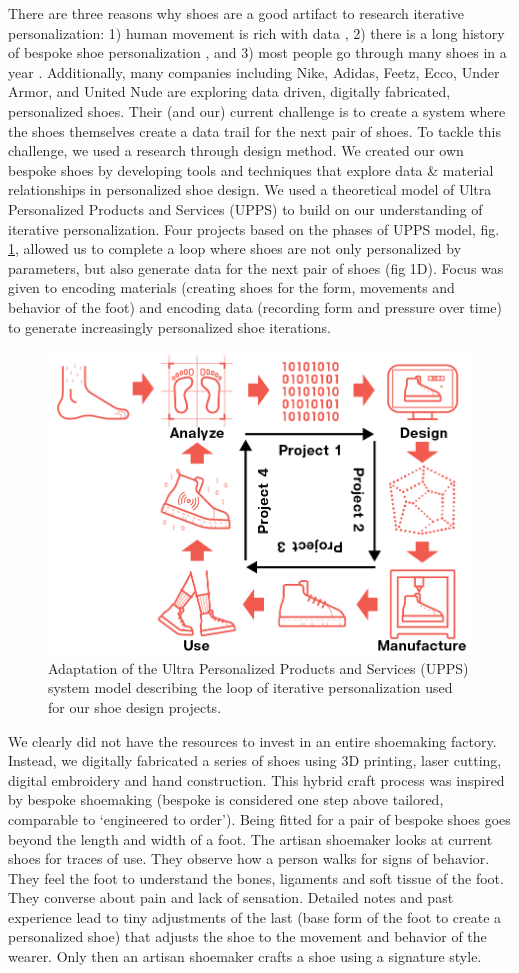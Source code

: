 There are three reasons why shoes are a good artifact to research iterative personalization: 1) human movement is rich with data \cite{Shanthikumar2010}, 2) there is a long history of bespoke shoe personalization \cite{Ball1935,Greene2018}, and 3) most people go through many shoes in a year \cite{Vertommen2011}. Additionally, many companies including Nike, Adidas, Feetz, Ecco, Under Armor, and United Nude are exploring data driven, digitally fabricated, personalized shoes. Their (and our) current challenge is to create a system where the shoes themselves create a data trail for the next pair of shoes. To tackle this challenge, we used a research through design method. We created our own bespoke shoes by developing tools and techniques that explore data \& material relationships in personalized shoe design. We used a theoretical model of Ultra Personalized Products and Services (UPPS) \cite{stolwijk2018going} to build on our understanding of iterative personalization. Four projects based on the phases of UPPS model, fig. \ref{fig:UPPSmodel}, allowed us to complete a loop where shoes are not only personalized by parameters, but also generate data for the next pair of shoes (fig 1D). Focus was given to encoding materials (creating shoes for the form, movements and behavior of the foot) and encoding data (recording form and pressure over time) to generate increasingly personalized shoe iterations. 

\begin{figure}
\includegraphics[width=.5\textwidth]{UPPSmodel}
\caption{Adaptation of the Ultra Personalized Products and Services (UPPS) system model describing the loop of iterative personalization used for our shoe design projects.}
\label{fig:UPPSmodel}
\end{figure}

We clearly did not have the resources to invest in an entire shoemaking factory. Instead, we digitally fabricated a series of shoes using 3D printing, laser cutting, digital embroidery and hand construction. This hybrid craft \cite{Devendorf2015} process was inspired by bespoke shoemaking (bespoke is considered one step above tailored, comparable to `engineered to order'). Being fitted for a pair of bespoke shoes goes beyond the length and width of a foot. The artisan shoemaker looks at current shoes for traces of use. They observe how a person walks for signs of behavior. They feel the foot to understand the bones, ligaments and soft tissue of the foot. They converse about pain and lack of sensation. Detailed notes and past experience lead to tiny adjustments of the last (base form of the foot to create a personalized shoe) that adjusts the shoe to the movement and behavior of the wearer. Only then an artisan shoemaker crafts a shoe using a signature style. 

